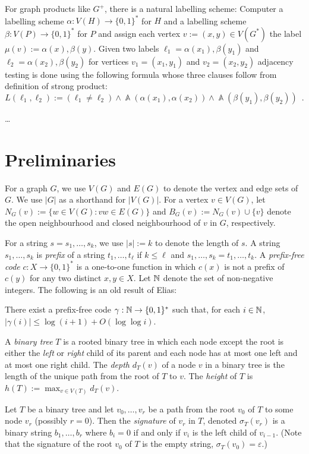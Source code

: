 \documentclass[kpfonts]{patmorin}
\DeclareMathOperator{\A}{\mathds{A}}
\begin{document}
For graph products like $G^+$, there is a natural labelling scheme: Computer a labelling scheme $\alpha:V(H)\to\{0,1\}^*$ for $H$ and a labelling scheme $\beta:V(P)\to\{0,1\}^*$ for $P$ and assign each vertex $v:=(x,y)\in V(G^*)$ the label $\mu(v):=\alpha(x),\beta(y)$.  Given two labels $\ell_1=\alpha(x_1),\beta(y_1)$ and $\ell_2=\alpha(x_2),\beta(y_2)$ for vertices $v_1=(x_1,y_1)$ and $v_2=(x_2,y_2)$ adjacency testing is done using the following formula whose three clauses follow from definition of strong product:
\[
    L(\ell_1,\ell_2):= (\ell_1\neq \ell_2) \wedge \A(\alpha(x_1),\alpha(x_2)) \wedge \A(\beta(y_1),\beta(y_2)) \enspace .
\]

\ldots



\section{Preliminaries}

For a graph $G$, we use $V(G)$ and $E(G)$ to denote the vertex and edge sets of $G$.  We use $|G|$ as a shorthand for $|V(G)|$. For a vertex $v\in V(G)$, let $N_G(v):=\{w\in V(G): vw\in E(G)\}$ and $B_G(v):=N_G(v)\cup\{v\}$ denote the open neighbourhood and closed neighbourhood of $v$ in $G$, respectively.

For a string $s=s_1,\ldots,s_k$, we use $|s|:=k$ to denote the length of $s$. A string $s_1,\ldots,s_k$ is \emph{prefix} of a string $t_1,\ldots,t_\ell$ if $k\le \ell$ and $s_1,\ldots,s_k=t_1,\ldots,t_k$.  A \emph{prefix-free code} $c:X\to\{0,1\}^*$ is a one-to-one function in which $c(x)$ is not a prefix of $c(y)$ for any two distinct $x,y\in X$.  Let $\mathbb{N}$ denote the set of non-negative integers.  The following is an old result of Elias:

\begin{lem}
    There exist a prefix-free code $\gamma:\mathbb{N}\to\{0,1\}^*$ such that, for each $i\in\mathbb{N}$, $|\gamma(i)|\le \log(i+1)+O(\log\log i)$.
\end{lem}

A \emph{binary tree} $T$ is a rooted binary tree in which each node except the root is either the \emph{left} or \emph{right} child of its parent and each node has at most one left and at most one right child.  The \emph{depth} $d_T(v)$ of a node $v$ in a binary tree is the length of the unique path from the root of $T$ to $v$.  The \emph{height} of $T$ is $h(T):=\max_{v\in V(T)} d_T(v)$.

Let $T$ be a binary tree and let $v_0,\ldots,v_{r}$ be a path from the root $v_0$ of $T$ to some node $v_r$ (possibly $r=0$).  Then the \emph{signature} of $v_r$ in $T$, denoted $\sigma_T(v_r)$ is a binary string $b_1,\ldots,b_r$ where $b_i=0$ if and only if $v_{i}$ is the left child of $v_{i-1}$.  (Note that the signature of the root $v_0$ of $T$ is the empty string,  $\sigma_T(v_0)=\varepsilon$.)
\end{document}
